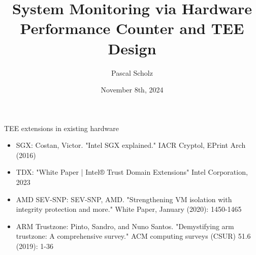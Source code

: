 \documentclass[aspectratio=169]{beamer}
\title[System Monitoring via Hardware Performance Counter and TEE Design]{System Monitoring via Hardware Performance Counter and TEE Design}
\author{Pascal Scholz}
\date{November 8th, 2024}
\begin{document}
\newcommand{\greencheck}{}%
\DeclareRobustCommand{\greencheck}{%
    \tikz\fill[scale=0.4, color=teal]
    (0,.35) -- (.25,0) -- (1,.7) -- (.25,.15) -- cycle;%
}

\maketitle


\begin{frame}{TEE extensions in existing hardware}
    \begin{itemize}
        \item SGX: Costan, Victor. "Intel SGX explained." {\footnotesize{IACR Cryptol, EPrint Arch (2016)}}
        \item TDX: "White Paper | Intel® Trust Domain Extensions" {\footnotesize{Intel Corporation, 2023}}
        \item AMD SEV-SNP: SEV-SNP, AMD. "Strengthening VM isolation with integrity protection and more." {\footnotesize{White Paper, January (2020): 1450-1465}}
        \item ARM Trustzone: Pinto, Sandro, and Nuno Santos. "Demystifying arm trustzone: A comprehensive survey." {\footnotesize{ACM computing surveys (CSUR) 51.6 (2019): 1-36}}
    \end{itemize}
\end{frame}
\end{document}
